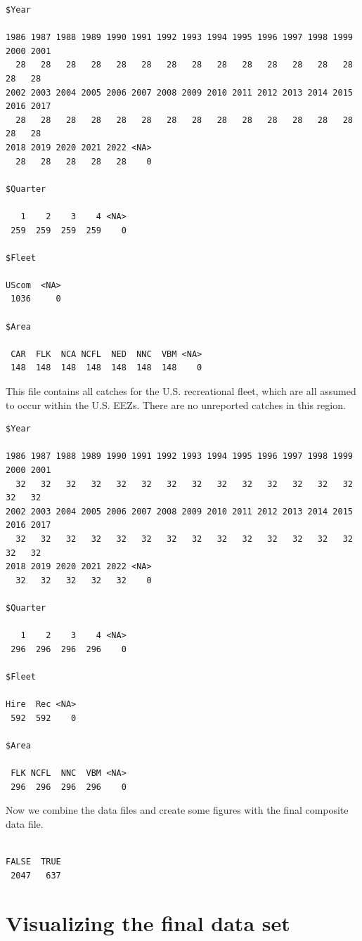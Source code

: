 \documentclass[
  letterpaper,
  oneside,
  open=any]{scrbook}
\begin{document}
\begin{verbatim}
$Year

1986 1987 1988 1989 1990 1991 1992 1993 1994 1995 1996 1997 1998 1999 2000 2001 
  28   28   28   28   28   28   28   28   28   28   28   28   28   28   28   28 
2002 2003 2004 2005 2006 2007 2008 2009 2010 2011 2012 2013 2014 2015 2016 2017 
  28   28   28   28   28   28   28   28   28   28   28   28   28   28   28   28 
2018 2019 2020 2021 2022 <NA> 
  28   28   28   28   28    0 

$Quarter

   1    2    3    4 <NA> 
 259  259  259  259    0 

$Fleet

UScom  <NA> 
 1036     0 

$Area

 CAR  FLK  NCA NCFL  NED  NNC  VBM <NA> 
 148  148  148  148  148  148  148    0 
\end{verbatim}

This file contains all catches for the U.S. recreational fleet, which
are all assumed to occur within the U.S. EEZs. There are no unreported
catches in this region.

\begin{verbatim}
$Year

1986 1987 1988 1989 1990 1991 1992 1993 1994 1995 1996 1997 1998 1999 2000 2001 
  32   32   32   32   32   32   32   32   32   32   32   32   32   32   32   32 
2002 2003 2004 2005 2006 2007 2008 2009 2010 2011 2012 2013 2014 2015 2016 2017 
  32   32   32   32   32   32   32   32   32   32   32   32   32   32   32   32 
2018 2019 2020 2021 2022 <NA> 
  32   32   32   32   32    0 

$Quarter

   1    2    3    4 <NA> 
 296  296  296  296    0 

$Fleet

Hire  Rec <NA> 
 592  592    0 

$Area

 FLK NCFL  NNC  VBM <NA> 
 296  296  296  296    0 
\end{verbatim}

Now we combine the data files and create some figures with the final
composite data file.

\begin{verbatim}

FALSE  TRUE 
 2047   637 
\end{verbatim}

\section{Visualizing the final data
set}\label{visualizing-the-final-data-set}
\end{document}
